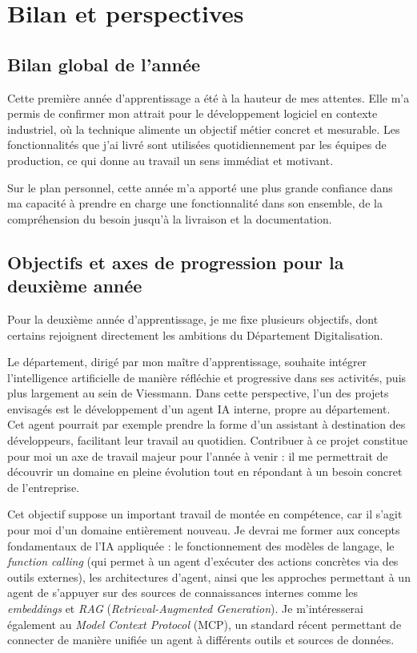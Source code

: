 \documentclass[pe1a]{tnreport} %
\begin{document}
\cleardoublepage

\chapter{Bilan et perspectives}

\section{Bilan global de l'année}

Cette première année d'apprentissage a été à la hauteur de mes attentes. Elle 
m'a permis de confirmer mon attrait pour le développement logiciel en 
contexte industriel, où la technique alimente un objectif métier concret et 
mesurable. Les fonctionnalités que j'ai livré sont utilisées 
quotidiennement par les équipes de production, ce qui donne au travail un 
sens immédiat et motivant.

Sur le plan personnel, cette année m'a apporté une plus grande confiance 
dans ma capacité à prendre en charge une fonctionnalité dans son ensemble, 
de la compréhension du besoin jusqu'à la livraison et la documentation.

\section{Objectifs et axes de progression pour la deuxième année}

Pour la deuxième année d'apprentissage, je me fixe plusieurs objectifs, dont 
certains rejoignent directement les ambitions du Département Digitalisation.

Le département, dirigé par mon maître d'apprentissage, souhaite intégrer 
l'intelligence artificielle de manière réfléchie et progressive dans ses 
activités, puis plus largement au sein de Viessmann. Dans cette perspective, 
l'un des projets envisagés est le développement d'un agent IA 
interne, propre au département. Cet agent pourrait par exemple prendre la 
forme d'un assistant à destination des développeurs, facilitant leur travail 
au quotidien. Contribuer à ce projet constitue pour moi un axe de travail 
majeur pour l'année à venir : il me permettrait de découvrir un domaine en 
pleine évolution tout en répondant à un besoin concret de l'entreprise.

Cet objectif suppose un important travail de montée en compétence, car il 
s'agit pour moi d'un domaine entièrement nouveau. Je devrai me former aux 
concepts fondamentaux de l'IA appliquée : le fonctionnement des modèles de 
langage, le \textit{function calling} (qui permet à un agent d'exécuter 
des actions concrètes via des outils externes), les architectures d'agent, 
ainsi que les approches permettant à un agent de s'appuyer sur des sources 
de connaissances internes comme les \textit{embeddings} et \textit{RAG} 
(\textit{Retrieval-Augmented Generation}). Je m'intéresserai également au 
\textit{Model Context Protocol} (MCP), un standard récent permettant de 
connecter de manière unifiée un agent à différents outils et sources de 
données.
\end{document}
